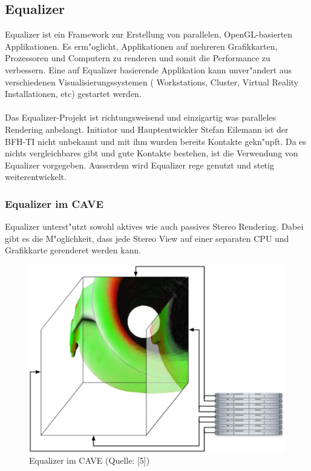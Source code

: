 \subsection{Equalizer}
Equalizer ist ein Framework zur Erstellung von parallelen, OpenGL-basierten Applikationen. Es erm"oglicht, Applikationen auf mehreren Grafikkarten, Prozessoren und Computern zu renderen und somit die Performance zu verbessern. 
Eine auf Equalizer basierende Applikation kann unver"andert aus verschiedenen Visualisierungssystemen ( Workstations, Cluster, Virtual Reality Installationen, etc) gestartet werden.

\paragraph{}
Das Equalizer-Projekt ist richtungsweisend und einzigartig was paralleles Rendering anbelangt. Initiator und Hauptentwickler Stefan Eilemann ist der BFH-TI nicht unbekannt und mit ihm wurden bereits Kontakte gekn"upft. Da es nichts vergleichbares gibt und gute Kontakte bestehen, ist die Verwendung von Equalizer vorgegeben. Ausserdem wird Equalizer rege genutzt und stetig weiterentwickelt. 

\subsubsection{Equalizer im CAVE}
Equalizer unterst"utzt sowohl aktives wie auch passives Stereo Rendering. Dabei gibt es die M"oglichkeit, dass jede Stereo View auf einer separaten CPU und Grafikkarte gerenderet werden kann. 

\begin{figure}[ht]
\begin{center}
\includegraphics[scale=0.3]{../figures/equalizer_cave}
\end{center}
\caption{Equalizer im CAVE (Quelle: [5])}
\end{figure} 

